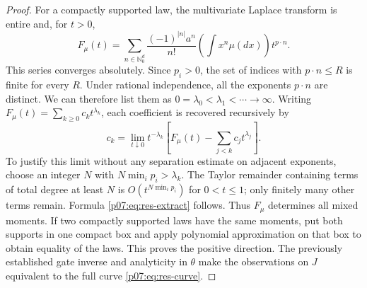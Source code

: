\documentclass[11pt,letterpaper]{article}
\theoremstyle{definition}
\theoremstyle{remark}
\newcommand{\1}{\mathbf 1}
\begin{document}
\begin{proof}
For a compactly supported law, the multivariate Laplace transform is
entire and, for $t>0$,
\begin{equation}\label{p07:eq:res-series}
 F_\mu(t)=\sum_{n\in\mathbb N_0^d}
 \frac{(-1)^{|n|}a^n}{n!}\left(\int x^n\mu(dx)\right)t^{p\cdot n}.
\end{equation}
This series converges absolutely.  Since $p_i>0$, the set of indices
with $p\cdot n\leq R$ is finite for every $R$.  Under rational
independence, all the exponents $p\cdot n$ are distinct.  We can
therefore list them as $0=\lambda_0<\lambda_1<\cdots\to\infty$.
Writing $F_\mu(t)=\sum_{k\geq0}c_kt^{\lambda_k}$, each coefficient is
recovered recursively by
\begin{equation}\label{p07:eq:res-extract}
 c_k=\lim_{t\downarrow0}t^{-\lambda_k}
 \left[F_\mu(t)-\sum_{j<k}c_jt^{\lambda_j}\right].
\end{equation}
To justify this limit without any separation estimate on adjacent
exponents, choose an integer $N$ with $N\min_i p_i>\lambda_k$.
The Taylor remainder containing terms of total degree at least $N$ is
$O(t^{N\min_i p_i})$ for $0<t\leq1$; only finitely many other terms
remain.  Formula \eqref{p07:eq:res-extract} follows.
Thus $F_\mu$ determines all mixed moments.  If two compactly supported
laws have the same moments, put both supports in one compact box and
apply polynomial approximation on that box to obtain equality of the
laws.  This proves the positive direction.  The previously established
gate inverse and analyticity in $\theta$ make the observations on $J$
equivalent to the full curve \eqref{p07:eq:res-curve}.


\end{proof}
\end{document}
